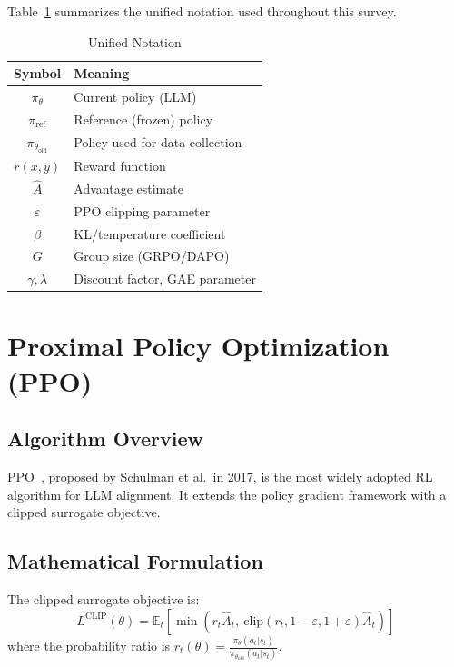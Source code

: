 \documentclass[10pt,twocolumn]{article}
\begin{document}
Table~\ref{tab:notation} summarizes the unified notation used throughout this survey.

\begin{table}[ht]
\centering
\caption{Unified Notation}
\label{tab:notation}
\begin{tabular}{cl}
\toprule
\textbf{Symbol} & \textbf{Meaning} \\
\midrule
$\pi_\theta$ & Current policy (LLM) \\
$\pi_{\text{ref}}$ & Reference (frozen) policy \\
$\pi_{\theta_{\text{old}}}$ & Policy used for data collection \\
$r(x,y)$ & Reward function \\
$\hat{A}$ & Advantage estimate \\
$\varepsilon$ & PPO clipping parameter \\
$\beta$ & KL/temperature coefficient \\
$G$ & Group size (GRPO/DAPO) \\
$\gamma, \lambda$ & Discount factor, GAE parameter \\
\bottomrule
\end{tabular}
\end{table}

\section{Proximal Policy Optimization (PPO)}
\label{sec:ppo}

\subsection{Algorithm Overview}

PPO~\cite{schulman2017ppo}, proposed by Schulman et al.\ in 2017, is the most widely adopted RL algorithm for LLM alignment. It extends the policy gradient framework with a clipped surrogate objective.

\subsection{Mathematical Formulation}

The clipped surrogate objective is:
\begin{equation}
L^{\text{CLIP}}(\theta) = \mathbb{E}_t\!\left[\min\!\left(r_t\hat{A}_t,\ \text{clip}(r_t, 1{-}\varepsilon, 1{+}\varepsilon)\hat{A}_t\right)\right]
\label{eq:ppo_clip}
\end{equation}
where the probability ratio is $r_t(\theta) = \frac{\pi_\theta(a_t|s_t)}{\pi_{\theta_{\text{old}}}(a_t|s_t)}$.
\end{document}
